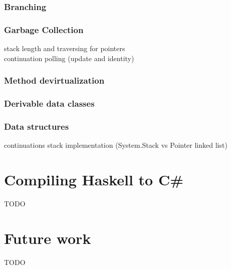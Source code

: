\documentclass[en]{pracamgr}
\begin{document}
\subsection{Branching}
\subsection{Garbage Collection}
stack length and traversing for pointers \\
continuation polling (update and identity)
\subsection{Method devirtualization}
\subsection{Derivable data classes}
\subsection{Data structures}
continuations stack implementation (System.Stack vs Pointer linked list) \\

\chapter{Compiling Haskell to C\#}\label{r:compiler}
TODO

\chapter{Future work}\label{r:future}
TODO
\end{document}
